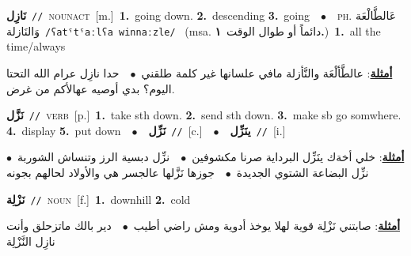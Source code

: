 \documentclass[10pt,a4paper,twoside]{article} %
\begin{document}
\begin{multicols}{2}
{\setlength\topsep{0pt}\textbf{\foreignlanguage{arabic}{نَازِل}}\ {\color{gray}\texttt{//}\color{black}}\ \textsc{noun\textunderscore act}\ [m.]\ \textbf{1.}~going down.  \textbf{2.}~descending  \textbf{3.}~going\ \ $\bullet$\ \ \textsc{ph.} \color{gray} \foreignlanguage{arabic}{عَالطَّالْعَة وَالنَازلة}\color{black}\ {\color{gray}\texttt{/{\sffamily ʕatˤtˤaːlʕa winnaːzle}/}\color{black}}\ \color{gray} (msa. \foreignlanguage{arabic}{دائماً أو طوال الوقت}~\foreignlanguage{arabic}{\textbf{١.}})\color{black}\ \textbf{1.}~all the time/always\  \begin{flushright}\color{gray}\foreignlanguage{arabic}{\textbf{\underline{\foreignlanguage{arabic}{أمثلة}}}: عالطَّألْعَة والنَّأزلة مافي علسانها غير كلمة طلقني\ $\bullet$\ \  حدا نازِل عرام الله التحتا اليوم؟ بدي أوصيه عهالأكم من غرض.}\end{flushright}\color{black}} \vspace{2mm}

{\setlength\topsep{0pt}\textbf{\foreignlanguage{arabic}{نَزَّل}}\ {\color{gray}\texttt{//}\color{black}}\ \textsc{verb}\ [p.]\ \textbf{1.}~take sth down.  \textbf{2.}~send sth down.  \textbf{3.}~make sb go somwhere.  \textbf{4.}~display  \textbf{5.}~put down\ \ $\bullet$\ \ \setlength\topsep{0pt}\textbf{\foreignlanguage{arabic}{نَزِّل}}\ {\color{gray}\texttt{//}\color{black}}\ [c.]\ \ $\bullet$\ \ \setlength\topsep{0pt}\textbf{\foreignlanguage{arabic}{ينَزِّل}}\ {\color{gray}\texttt{//}\color{black}}\ [i.]\  \begin{flushright}\color{gray}\foreignlanguage{arabic}{\textbf{\underline{\foreignlanguage{arabic}{أمثلة}}}: خلي أخةك ينَزِّل البرداية صرنا مكشوفين\ $\bullet$\ \  نزِّل دبسية الرز وتنساش الشوربة\ $\bullet$\ \  نزِّل البضاعة الشتوي الجديدة\ $\bullet$\ \  جوزها نَزَّلها عالجسر هي والأولاد لحالهم بجونه}\end{flushright}\color{black}} \vspace{2mm}

{\setlength\topsep{0pt}\textbf{\foreignlanguage{arabic}{نَزْلِة}}\ {\color{gray}\texttt{//}\color{black}}\ \textsc{noun}\ [f.]\ \textbf{1.}~downhill  \textbf{2.}~cold\  \begin{flushright}\color{gray}\foreignlanguage{arabic}{\textbf{\underline{\foreignlanguage{arabic}{أمثلة}}}: صابتني نَزْلِة قوية لهلا يوخذ أدوية ومش راضي أطيب\ $\bullet$\ \  دير بالك ماتزحلق وأنت نازِل النَّزْلِة}\end{flushright}\color{black}} \vspace{2mm}


\end{multicols}
\end{document}
